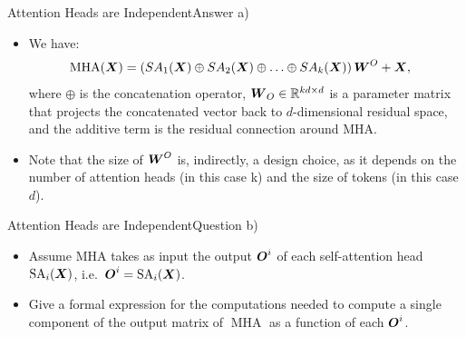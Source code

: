 \documentclass[t]{beamer}
\newcommand\op[1]{\operatorname{#1}}
\begin{document}
\begin{frame}{Attention Heads are Independent}{Answer a)}
    \begin{itemize}
        \item We have:
              \begin{align}
                  \op{MHA}(\mX) & = \left(SA_1(\mX) \oplus SA_2(\mX) \oplus \ldots \oplus SA_k(\mX)\right)\mW^O + \mX,
              \end{align}
              where $\oplus$ is the concatenation operator,
              ${\boldsymbol{W}}_O\in\mathbb{R}^{kd\times d}$ is a parameter matrix that projects
              the concatenated vector back to $d$-dimensional residual space,
              and the additive term is the residual connection around MHA.
        \item Note that the size of ${\boldsymbol{W}}^O$ is, indirectly, a design choice, as
              it depends on the number of attention heads (in this case k) and
              the size of tokens (in this case $d$).
    \end{itemize}
\end{frame}

\begin{frame}{Attention Heads are Independent}{Question b)}
    \begin{itemize}
        \item Assume MHA takes as input the output ${\boldsymbol{O}}^i$ of each
              self-attention head
              $\op{SA}_i(\mX)$, i.e.\ $\mO^i = \op{SA}_i(\mX)$.
        \item Give a formal expression for the computations needed to compute a
              single component of the output matrix of $\op{MHA}$ as a function
              of each ${\boldsymbol{O}}^i$.
    \end{itemize}
\end{frame}
\end{document}
